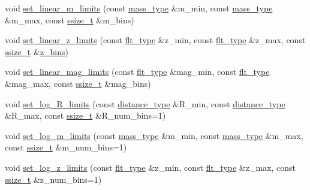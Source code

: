 \begin{DoxyCompactItemize}
\item 
void \hyperlink{classIceBRG_1_1pair__bins__summary_a7b2524d7dfe25fbcdc378cbc36573946}{set\+\_\+linear\+\_\+m\+\_\+limits} (const \hyperlink{namespaceIceBRG_a1be72ac4918a9b029f2eefa084213e35}{mass\+\_\+type} \&m\+\_\+min, const \hyperlink{namespaceIceBRG_a1be72ac4918a9b029f2eefa084213e35}{mass\+\_\+type} \&m\+\_\+max, const \hyperlink{lib_2IceBRG__main_2common_8h_ab322a3e50421dc5f0c43316b1b373592}{ssize\+\_\+t} \&m\+\_\+bins)
\item 
void \hyperlink{classIceBRG_1_1pair__bins__summary_a42909af4d308561fc055ea4c6766a752}{set\+\_\+linear\+\_\+z\+\_\+limits} (const \hyperlink{lib_2IceBRG__main_2common_8h_ad0f130a56eeb944d9ef2692ee881ecc4}{flt\+\_\+type} \&z\+\_\+min, const \hyperlink{lib_2IceBRG__main_2common_8h_ad0f130a56eeb944d9ef2692ee881ecc4}{flt\+\_\+type} \&z\+\_\+max, const \hyperlink{lib_2IceBRG__main_2common_8h_ab322a3e50421dc5f0c43316b1b373592}{ssize\+\_\+t} \&\hyperlink{main__field__stats_8cpp_a6d4d8cfc3c2eccfe9ed5091d304e8dcd}{z\+\_\+bins})
\item 
void \hyperlink{classIceBRG_1_1pair__bins__summary_a0dfc0341ace9bdf0d98b301bafbeebed}{set\+\_\+linear\+\_\+mag\+\_\+limits} (const \hyperlink{lib_2IceBRG__main_2common_8h_ad0f130a56eeb944d9ef2692ee881ecc4}{flt\+\_\+type} \&mag\+\_\+min, const \hyperlink{lib_2IceBRG__main_2common_8h_ad0f130a56eeb944d9ef2692ee881ecc4}{flt\+\_\+type} \&mag\+\_\+max, const \hyperlink{lib_2IceBRG__main_2common_8h_ab322a3e50421dc5f0c43316b1b373592}{ssize\+\_\+t} \&mag\+\_\+bins)
\item 
void \hyperlink{classIceBRG_1_1pair__bins__summary_a25e1c227f1d508602345aaf5c3bf2f6f}{set\+\_\+log\+\_\+\+R\+\_\+limits} (const \hyperlink{namespaceIceBRG_a45499647eb87e24c10ab32c628711cec}{distance\+\_\+type} \&R\+\_\+min, const \hyperlink{namespaceIceBRG_a45499647eb87e24c10ab32c628711cec}{distance\+\_\+type} \&R\+\_\+max, const \hyperlink{lib_2IceBRG__main_2common_8h_ab322a3e50421dc5f0c43316b1b373592}{ssize\+\_\+t} \&R\+\_\+num\+\_\+bins=1)
\item 
void \hyperlink{classIceBRG_1_1pair__bins__summary_aae072aa17b4d036a2b75adadd051e7b7}{set\+\_\+log\+\_\+m\+\_\+limits} (const \hyperlink{namespaceIceBRG_a1be72ac4918a9b029f2eefa084213e35}{mass\+\_\+type} \&m\+\_\+min, const \hyperlink{namespaceIceBRG_a1be72ac4918a9b029f2eefa084213e35}{mass\+\_\+type} \&m\+\_\+max, const \hyperlink{lib_2IceBRG__main_2common_8h_ab322a3e50421dc5f0c43316b1b373592}{ssize\+\_\+t} \&m\+\_\+num\+\_\+bins=1)
\item 
void \hyperlink{classIceBRG_1_1pair__bins__summary_aa4cc8227dd39e7694b0c7ed8f628a239}{set\+\_\+log\+\_\+z\+\_\+limits} (const \hyperlink{lib_2IceBRG__main_2common_8h_ad0f130a56eeb944d9ef2692ee881ecc4}{flt\+\_\+type} \&z\+\_\+min, const \hyperlink{lib_2IceBRG__main_2common_8h_ad0f130a56eeb944d9ef2692ee881ecc4}{flt\+\_\+type} \&z\+\_\+max, const \hyperlink{lib_2IceBRG__main_2common_8h_ab322a3e50421dc5f0c43316b1b373592}{ssize\+\_\+t} \&z\+\_\+num\+\_\+bins=1)

\end{DoxyCompactItemize}
